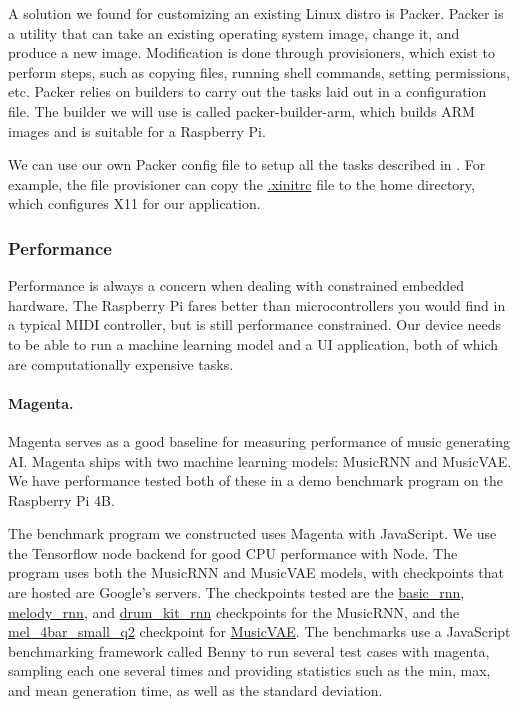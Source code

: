 A solution we found for customizing an existing Linux distro is Packer. Packer is a
utility that can take an existing operating system image, change it, and produce a new
image. Modification is done through provisioners, which exist to perform steps, such as
copying files, running shell commands, setting permissions, etc. Packer relies on builders
to carry out the tasks laid out in a configuration file. The builder we will use is called
packer-builder-arm, which builds ARM images and is suitable for a Raspberry Pi.

We can use our own Packer config file to setup all the tasks described in
. For example, the file provisioner can copy the
\url{.xinitrc} file to the home directory, which configures X11 for our application.

\subsubsection{Performance}

Performance is always a concern when dealing with constrained embedded hardware. The
Raspberry Pi fares better than microcontrollers you would find in a typical MIDI
controller, but is still performance constrained. Our device needs to be able to run a
machine learning model and a UI application, both of which are computationally expensive
tasks.

\paragraph{Magenta.}

Magenta serves as a good baseline for measuring performance of music generating AI.
Magenta ships with two machine learning models: MusicRNN and MusicVAE. We have performance
tested both of these in a demo benchmark program on the Raspberry Pi 4B.

The benchmark program we constructed uses Magenta with JavaScript. We use the Tensorflow
node backend for good CPU performance with Node. The program uses both the MusicRNN and
MusicVAE models, with checkpoints that are hosted are Google's servers. The checkpoints
tested are the \url{basic_rnn}, \url{melody_rnn}, and \url{drum_kit_rnn} checkpoints for
the MusicRNN, and the \url{mel_4bar_small_q2} checkpoint for \url{MusicVAE}. The benchmarks
use a JavaScript benchmarking framework called Benny to run several test cases with
magenta, sampling each one several times and providing statistics such as the min, max,
and mean generation time, as well as the standard deviation.

